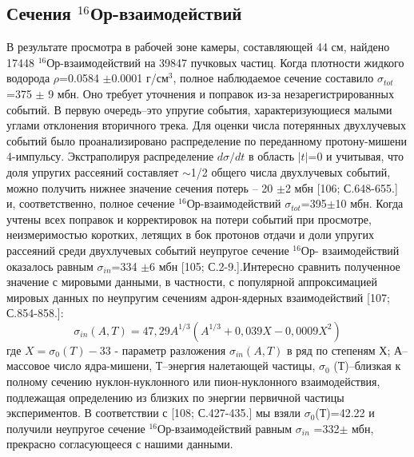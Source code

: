 \documentclass[fontsize=14pt]{scrarticle}
\begin{document}
\subsection{Сечения $^{16}$Ор-взаимодействий}
\hspace{0.6cm}
В результате просмотра в рабочей зоне камеры, составляющей 44 см,
найдено 17448 $^{16}$Ор-взаимодействий на 39847 пучковых частиц. Когда плотности жидкого водорода $\rho$=0.0584 $\pm$0.0001 г/см$^{3}$, полное наблюдаемое сечение составило $\sigma_{tot}$=375 $\pm$ 9 мбн. Оно требует уточнения и поправок из-за незарегистрированных событий. В первую очередь–это упругие события,
характеризующиеся малыми углами отклонения вторичного трека. Для
оценки числа потерянных двухлучевых событий было проанализировано
распределение по переданному протону-мишени 4-импульсу. Экстраполируя
распределение $d\sigma/dt$ в область $|t|$=0 и учитывая, что доля упругих рассеяний составляет $\sim$1/2 общего числа двухлучевых событий, можно получить нижнее значение сечения потерь – 20 $\pm$2 мбн [106; С.648-655.] и, соответственно, полное сечение $^{16}$Ор-взаимодействий $\sigma_{tot}$=395$\pm$10 мбн. Когда
учтены всех поправок и корректировок на потери событий при просмотре, неизмеримостью коротких, летящих в бок протонов отдачи и доли упругих
рассеяний среди двухлучевых событий неупругое сечение $^{16}$Ор-
взаимодействий оказалось равным $\sigma_{in}$=334 $\pm$6 мбн [105; С.2-9.].Интересно сравнить полученное значение с мировыми данными, в частности, с популярной аппроксимацией мировых данных по неупругим сечениям адрон-ядерных взаимодействий [107; С.854-858.]:
\begin{equation}
    \sigma_{in}(A,T) = 47,29 A^{1/3}(A^{1/3} + 0,039 X - 0,0009X^{2})
\end{equation}
где $X=\sigma_{0}(T)-33$ - параметр разложения $\sigma_{in}(A,T)$ в ряд по степеням Х; А–
массовое число ядра-мишени, Т–энергия налетающей частицы, $\sigma_{0}$ (Т)–близкая к полному сечению нуклон-нуклонного или
пион-нуклонного взаимодействия, подлежащая определению из близких по энергии первичной частицы экспериментов. В соответствии с [108; С.427-435.] мы взяли
$\sigma_{0}$(Т)=42.22 и получили неупругое сечение $^{16}$Ор-взаимодействий равным $\sigma_{in}$ =332$\pm$ мбн, прекрасно согласующееся с нашими данными.
\end{document}
